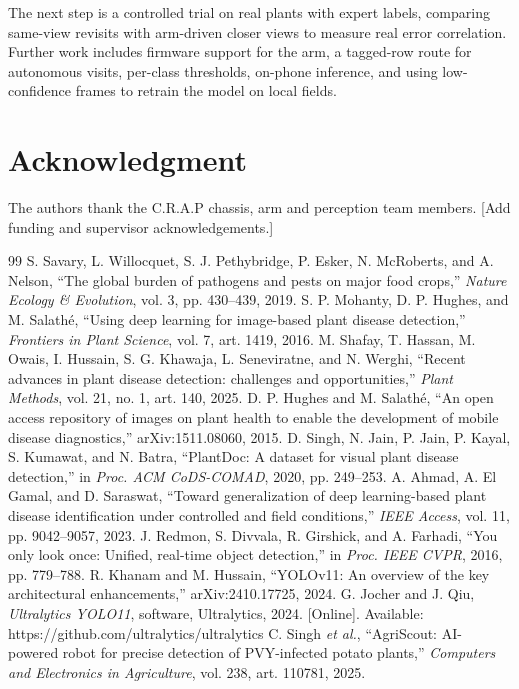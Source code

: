 \documentclass[conference]{IEEEtran}
\begin{document}
The next step is a controlled trial on real plants with expert labels, comparing same-view revisits with arm-driven closer views to measure real error correlation. Further work includes firmware support for the arm, a tagged-row route for autonomous visits, per-class thresholds, on-phone inference, and using low-confidence frames to retrain the model on local fields.

\section*{Acknowledgment}
The authors thank the C.R.A.P chassis, arm and perception team members. [Add funding and supervisor acknowledgements.]
\begin{thebibliography}{99}
 S. Savary, L. Willocquet, S. J. Pethybridge, P. Esker, N. McRoberts, and A. Nelson, ``The global burden of pathogens and pests on major food crops,'' \emph{Nature Ecology \& Evolution}, vol. 3, pp. 430--439, 2019.
 S. P. Mohanty, D. P. Hughes, and M. Salathé, ``Using deep learning for image-based plant disease detection,'' \emph{Frontiers in Plant Science}, vol. 7, art. 1419, 2016.
 M. Shafay, T. Hassan, M. Owais, I. Hussain, S. G. Khawaja, L. Seneviratne, and N. Werghi, ``Recent advances in plant disease detection: challenges and opportunities,'' \emph{Plant Methods}, vol. 21, no. 1, art. 140, 2025.
 D. P. Hughes and M. Salathé, ``An open access repository of images on plant health to enable the development of mobile disease diagnostics,'' arXiv:1511.08060, 2015.
 D. Singh, N. Jain, P. Jain, P. Kayal, S. Kumawat, and N. Batra, ``PlantDoc: A dataset for visual plant disease detection,'' in \emph{Proc. ACM CoDS-COMAD}, 2020, pp. 249--253.
 A. Ahmad, A. El Gamal, and D. Saraswat, ``Toward generalization of deep learning-based plant disease identification under controlled and field conditions,'' \emph{IEEE Access}, vol. 11, pp. 9042--9057, 2023.
 J. Redmon, S. Divvala, R. Girshick, and A. Farhadi, ``You only look once: Unified, real-time object detection,'' in \emph{Proc. IEEE CVPR}, 2016, pp. 779--788.
 R. Khanam and M. Hussain, ``YOLOv11: An overview of the key architectural enhancements,'' arXiv:2410.17725, 2024.
 G. Jocher and J. Qiu, \emph{Ultralytics YOLO11}, software, Ultralytics, 2024. [Online]. Available: https://github.com/ultralytics/ultralytics
 C. Singh \emph{et al.}, ``AgriScout: AI-powered robot for precise detection of PVY-infected potato plants,'' \emph{Computers and Electronics in Agriculture}, vol. 238, art. 110781, 2025.

\end{thebibliography}
\end{document}
